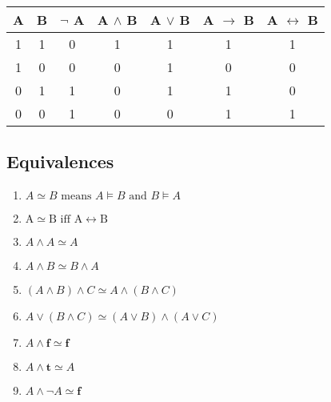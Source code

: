 \documentclass{article}
\begin{document}
\begin{table}[ht]
\begin{tabular}{|cc|ccccc|}
\hline
A & B & \multicolumn{1}{l|}{$\neg$ A} & \multicolumn{1}{l|}{A $\wedge$ B} & \multicolumn{1}{l|}{A $\vee$ B} & \multicolumn{1}{l|}{A $\rightarrow$ B} & \multicolumn{1}{l|}{A $\leftrightarrow$ B} \\ \hline
1 & 1 & 0                          & 1                            & 1                           & 1                                      & 1                                                 \\ \cline{1-2}
1 & 0 & 0                          & 0                            & 1                           & 0                                      & 0                                                 \\ \cline{1-2}
0 & 1 & 1                          & 0                            & 1                           & 1                                      & 0                                                 \\ \cline{1-2}
0 & 0 & 1                          & 0                            & 0                           & 1                                      & 1                                                 \\ \cline{1-2}
\hline
\end{tabular}
\end{table}

\subsection{Equivalences}
\begin{enumerate}
    \item $A \simeq B \text { means } A \vDash B \text { and } B \vDash A$
    \item $\mathrm{A} \simeq \mathrm{B} \text { iff } \mathrm{A} \leftrightarrow \mathrm{B}$
    \item $A \wedge A \simeq A$
    \item $A \wedge B \simeq B \wedge A$
    \item $(A \wedge B) \wedge C \simeq A \wedge(B \wedge C)$
    \item $A \vee(B \wedge C) \simeq(A \vee B) \wedge(A \vee C)$
    \item $A \wedge \mathbf{f} \simeq \mathbf{f}$
    \item $A \wedge \mathbf{t} \simeq A$
    \item $A \wedge \neg A \simeq \mathbf{f}$
\end{enumerate}
\end{document}
